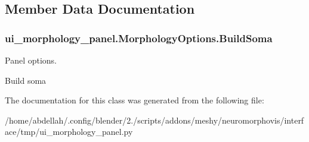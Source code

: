 \subsection{Member Data Documentation}
\subsubsection[{\texorpdfstring{Build\+Soma}{BuildSoma}}]{\setlength{\rightskip}{0pt plus 5cm}ui\+\_\+morphology\+\_\+panel.\+Morphology\+Options.\+Build\+Soma\hspace{0.3cm}{\ttfamily [static]}}\hypertarget{classui__morphology__panel_1_1MorphologyOptions_a2a53ae489e08b98d8bfe38bb8c9aa9e3}{}\label{classui__morphology__panel_1_1MorphologyOptions_a2a53ae489e08b98d8bfe38bb8c9aa9e3}


Panel options. 

Build soma 

The documentation for this class was generated from the following file\+:\begin{DoxyCompactItemize}
\item 
/home/abdellah/.\+config/blender/2./scripts/addons/meshy/neuromorphovis/interface/tmp/ui\+\_\+morphology\+\_\+panel.\+py\end{DoxyCompactItemize}
